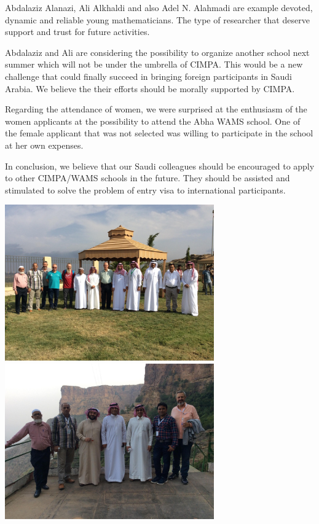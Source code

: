 \documentclass[12pt,a4paper]{scrartcl}
\begin{document}
Abdalaziz Alanazi, Ali Alkhaldi and also Adel N. Alahmadi are example devoted, dynamic and reliable young mathematicians. The type of researcher that deserve support and trust for future activities.

Abdalaziz and Ali are considering the possibility to organize another school next summer which will not be under the umbrella of CIMPA. This would be a new challenge that could finally succeed in bringing foreign participants in Saudi Arabia. We believe the their efforts should be morally supported by CIMPA. 

Regarding the attendance of women, we were surprised at the enthusiasm of the women applicants at the possibility to attend the Abha WAMS school. One of the female applicant that was not selected 
was willing to participate in the school at her own expenses.

In conclusion, we believe that our Saudi colleagues should be encouraged to apply to other CIMPA/WAMS schools in the future. They should be assisted and stimulated to solve the problem of entry visa to international participants. 

\centerline{\includegraphics[width=9cm]{1.jpg}
\includegraphics[width=9cm]{3.jpg}}
\end{document}
